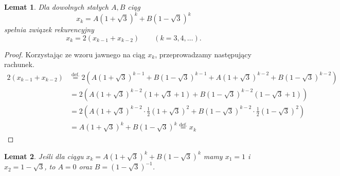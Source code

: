 \documentclass{article}
\newtheorem{lem}{Lemat}[section]
\begin{document}
\begin{lem}
    \label{lem:rek}
    Dla dowolnych stałych \(A,B\) ciąg
    \[
        x_k = A(1+\sqrt{3})^k + B(1-\sqrt{3})^k
    \]
    spełnia związek rekurencyjny
    \begin{equation}\tag{WRek}\label{wzor_rek}
        x_k = 2(x_{k-1} + x_{k-2}) \quad\quad (k=3, 4, \ldots) \text{.}
    \end{equation}
        
\end{lem}

\begin{proof}
    Korzystając ze wzoru jawnego na ciąg \(x_k\), przeprowadzamy następujący rachunek.
    \begin{align*}
        2(x_{k-1} + x_{k-2}) &\stackrel{\text{def.}}{=} 
        2\left(  A(1+\sqrt{3})^{k-1} + B(1-\sqrt{3})^{k-1} +  A(1+\sqrt{3})^{k-2} + B(1-\sqrt{3})^{k-2} \right) \\
        &= 2\left( A(1+\sqrt{3})^{k-2}(1+\sqrt{3}+1) + B(1-\sqrt{3})^{k-2}(1-\sqrt{3}+1) \right) \\
        &= 2\left( A(1+\sqrt{3})^{k-2} \cdot \frac{1}{2}(1+\sqrt{3})^2 + B(1-\sqrt{3})^{k-2} \cdot \frac{1}{2}(1-\sqrt{3})^2 \right) \\
        &= A(1+\sqrt{3})^k + B(1-\sqrt{3})^k \stackrel{\text{def.}}{=} x_k
    \end{align*}
\end{proof}

\begin{lem}
    \label{lem:stale}
    Jeśli dla ciągu \(x_k = A(1+\sqrt{3})^k + B(1-\sqrt{3})^k\) mamy \(x_1 = 1\) i \(x_2 = 1 - \sqrt{3}\), to \(A = 0\) oraz \(B = (1 - \sqrt{3})^{-1}\).
\end{lem}
\end{document}
